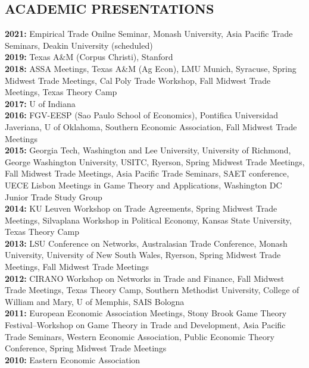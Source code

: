 \documentclass[11pt]{res}
\begin{document}
\begin{resume}
\section{ACADEMIC PRESENTATIONS}\vspace{1.5mm}
{\bf 2021:} Empirical Trade Onilne Seminar, Monash University, Asia Pacific Trade Seminars, Deakin University (scheduled) \vspace{1.5mm}\\
{\bf 2019:} Texas A\&M (Corpus Christi), Stanford \vspace{1.5mm}\\
{\bf 2018:} ASSA Meetings, Texas A\&M (Ag Econ), LMU Munich, Syracuse, Spring Midwest Trade Meetings, Cal Poly Trade Workshop, Fall Midwest Trade Meetings, Texas Theory Camp \vspace{1.5mm}\\
{\bf 2017:} U of Indiana \vspace{1.5mm}\\
{\bf 2016:} FGV-EESP (Sao Paulo School of Economics), Pontifica Universidad Javeriana, U of Oklahoma, Southern Economic Association, Fall Midwest Trade Meetings\vspace{1.5mm}\\
{\bf 2015:} Georgia Tech, Washington and Lee University, University of Richmond, George Washington University, USITC, Ryerson, Spring Midwest Trade Meetings, Fall Midwest Trade Meetings, Asia Pacific Trade Seminars, SAET conference, UECE Lisbon Meetings in Game Theory and Applications, Washington DC Junior Trade Study Group\vspace{1.5mm}\\
{\bf 2014:} KU Leuven Workshop on Trade Agreements, Spring Midwest Trade Meetings, Silvaplana Workshop in Political Economy, Kansas State University, Texas Theory Camp\vspace{1.5mm}\\
{\bf 2013:} LSU Conference on Networks, Australasian Trade Conference, Monash University, University of New South Wales, Ryerson, Spring Midwest Trade Meetings, Fall Midwest Trade Meetings \vspace{1.5mm}\\
{\bf 2012:}  CIRANO Workshop on Networks in Trade and Finance, Fall Midwest Trade Meetings, Texas Theory Camp, Southern Methodist University, College of William and Mary, U of Memphis, SAIS Bologna\vspace{1.5mm}\\
{\bf 2011:} European Economic Association Meetings, Stony Brook Game Theory Festival--Workshop on Game Theory in Trade and Development, Asia Pacific Trade Seminars, Western Economic Association, Public Economic Theory Conference, Spring Midwest Trade Meetings\vspace{1.5mm}\\
{\bf 2010:} Eastern Economic Association


\end{resume}
\end{document}
